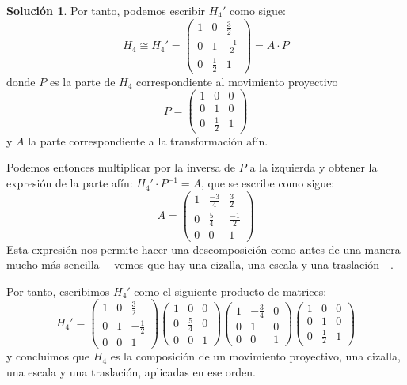 \documentclass[a4paper, 11pt]{article}
\theoremstyle{definition}
\newtheorem*{solucion}{Solución}
\theoremstyle{theorem}
\begin{document}
\begin{solucion}
      Por tanto, podemos escribir $H_4'$ como sigue:
      \[
      H_4 \cong H_4' =
      \left(
      \begin{array}{ccc}
          1 & 0 & \frac{3}{2} \\
          0 & 1 & \frac{-1}{2} \\
          0 & \frac{1}{2} & 1
      \end{array}\right) = A\cdot P
      \]
      donde $P$ es la parte de $H_4$ correspondiente al movimiento proyectivo
      \[P =\begin{pmatrix}
          1 & 0 & 0 \\
          0 & 1 & 0 \\
          0 & \frac{1}{2} & 1
      \end{pmatrix}
      \]
      y $A$ la parte correspondiente a la transformación afín.

      Podemos entonces multiplicar por la inversa de $P$ a la izquierda y obtener la expresión de la parte afín: $H_4' \cdot P^{-1} = A$, que se escribe como sigue:
      \[
      A = \begin{pmatrix}
        1 & \frac{-3}{4} & \frac{3}{2} \\
        0 & \frac{5}{4} & \frac{-1}{2} \\
        0 & 0 & 1
      \end{pmatrix}
      \]
      Esta expresión nos permite hacer una descomposición como antes de una manera mucho más sencilla ---vemos que hay una cizalla, una escala y una traslación---.

      Por tanto, escribimos $H_4'$ como el siguiente producto de matrices:
      \[
          H_4' = \begin{pmatrix}
              1 & 0 & \frac{3}{2} \\
              0 & 1 & -\frac{1}{2} \\
              0 & 0 & 1
          \end{pmatrix}
          \begin{pmatrix}
              1 & 0 & 0 \\
              0 & \frac{5}{4} & 0 \\
              0 & 0 & 1
          \end{pmatrix}
          \begin{pmatrix}
              1 & -\frac{3}{4} & 0 \\
              0 & 1 & 0 \\
              0 & 0 & 1
          \end{pmatrix}
          \begin{pmatrix}
              1 & 0 & 0 \\
              0 & 1 & 0 \\
              0 & \frac{1}{2} & 1
          \end{pmatrix}
      \]
      y concluimos que $H_4$ es la composición de un movimiento proyectivo, una cizalla, una escala y una traslación, aplicadas en ese orden.
  \end{solucion}
\end{document}
